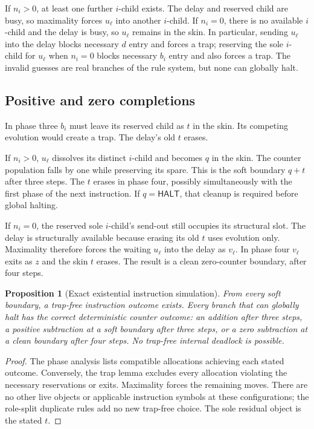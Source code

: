 \documentclass[11pt,letterpaper]{article}
\newtheorem{proposition}[theorem]{Proposition}
\theoremstyle{definition}
\theoremstyle{remark}
\newcommand{\HALT}{\mathsf{HALT}}
\begin{document}
If $n_i>0$, at least one further $i$-child exists. The delay and reserved child are busy, so maximality forces $u_\ell$ into another $i$-child. If $n_i=0$, there is no available $i$-child and the delay is busy, so $u_\ell$ remains in the skin. In particular, sending $u_\ell$ into the delay blocks necessary $d$ entry and forces a trap; reserving the sole $i$-child for $u_\ell$ when $n_i=0$ blocks necessary $b_i$ entry and also forces a trap. The invalid guesses are real branches of the rule system, but none can globally halt.

\subsection{Positive and zero completions}
In phase three $b_i$ must leave its reserved child as $t$ in the skin. Its competing evolution would create a trap. The delay's old $t$ erases.

If $n_i>0$, $u_\ell$ dissolves its distinct $i$-child and becomes $q$ in the skin. The counter population falls by one while preserving its spare. This is the soft boundary $q+t$ after three steps. The $t$ erases in phase four, possibly simultaneously with the first phase of the next instruction. If $q=\HALT$, that cleanup is required before global halting.

If $n_i=0$, the reserved sole $i$-child's send-out still occupies its structural slot. The delay is structurally available because erasing its old $t$ uses evolution only. Maximality therefore forces the waiting $u_\ell$ into the delay as $v_\ell$. In phase four $v_\ell$ exits as $z$ and the skin $t$ erases. The result is a clean zero-counter boundary, after four steps.

\begin{proposition}[Exact existential instruction simulation]\label{qoc:um:prop:mem}
From every soft boundary, a trap-free instruction outcome exists. Every branch that can globally halt has the correct deterministic counter outcome: an addition after three steps, a positive subtraction at a soft boundary after three steps, or a zero subtraction at a clean boundary after four steps. No trap-free internal deadlock is possible.
\end{proposition}
\begin{proof}
The phase analysis lists compatible allocations achieving each stated outcome. Conversely, the trap lemma excludes every allocation violating the necessary reservations or exits. Maximality forces the remaining moves. There are no other live objects or applicable instruction symbols at these configurations; the role-split duplicate rules add no new trap-free choice. The sole residual object is the stated $t$.
\end{proof}
\end{document}
